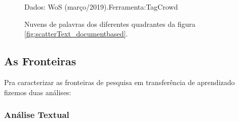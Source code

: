 \documentclass[sigconf]{acmart}
\newcommand{\source}[2]{\raggedleft{}\vspace*{-7mm}\caption*{ \textmd{\scriptsize{Dados: {#1}.\hfill Ferramenta:{#2}}}}}
\begin{document}
\begin{figure}
  \source{WoS (março/2019)}{TagCrowd}
  \caption{Nuvens de palavras dos diferentes quadrantes da figura \ref{fig:scatterText_documentbased}.} \label{fig:clouds}
\end{figure}


\subsection{As Fronteiras}\label{fronteiras}
  Pra caracterizar as fronteiras de pesquisa em transferência de aprendizado fizemos duas análises:
  \subsubsection{Análise Textual}
\end{document}
